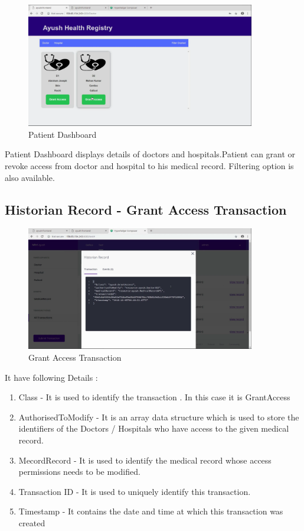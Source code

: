 \documentclass[11pt]{report}
\begin{document}
    \begin{figure}[h!]
        \centering
        \includegraphics[scale=0.3,width=10cm]{Proto2.png}
        \caption{Patient Dashboard}
        \label{fig:my_label}
    \end{figure}
    Patient Dashboard displays details of doctors and hospitals.Patient can grant or revoke access from doctor and hospital to his medical record. Filtering option is also available. 
     \subsection{Historian Record - Grant Access Transaction}  
    \begin{figure}[h!]
        \centering
        \includegraphics[scale=0.3,width=10cm]{Proto3.png}
        \caption{Grant Access Transaction}
        \label{fig:my_label}
    \end{figure}
    It have following Details :
    \begin{enumerate}
        \item Class - It is used to identify the transaction . In this case it is GrantAccess
        \item AuthorisedToModify - It is an array data structure which is used to store the identifiers of the Doctors / Hospitals who have access to the given medical record.
        \item MecordRecord - It is used to identify the medical record whose access permissions needs to be modified.
        \item Transaction ID - It is used to uniquely identify this transaction.
        \item Timestamp - It contains the date and time at which this transaction was created
    \end{enumerate}
    
\end{document}
